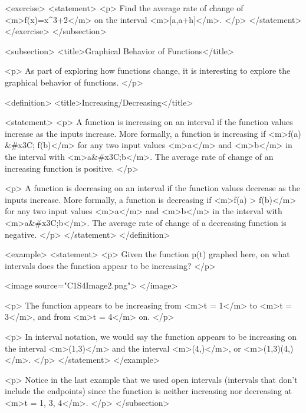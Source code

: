         <exercise>
            <statement>
                <p>
                    Find the average rate of change of <m>f(x)=x^{3}+2</m> on the interval <m>[a,a+h]</m>.
                </p>
            </statement>
        </exercise>
    </subsection>


    <subsection>
        <title>Graphical Behavior of Functions</title>

        <p>
            As part of exploring how functions change, it is interesting to explore the graphical behavior of functions.
        </p>

        <definition>
            <title>Increasing/Decreasing</title>

            <statement>
                <p>
                    A function is increasing on an interval if the function values increase as the inputs increase.
                    More formally, a function is increasing if <m>f(a) &#x3C; f(b)</m> for any two input values <m>a</m> and <m>b</m> in the interval with <m>a&#x3C;b</m>.
                    The average rate of change of an increasing function is positive.
                </p>

                <p>
                    A function is decreasing on an interval if the function values decrease as the inputs increase.
                    More formally, a function is decreasing if <m>f(a) > f(b)</m> for any two input values <m>a</m> and <m>b</m> in the interval with <m>a&#x3C;b</m>.
                    The average rate of change of a decreasing function is negative.
                </p>
            </statement>
        </definition>

        <example>
            <statement>
                <p>
                    Given the function p(t) graphed here, on what intervals does the function appear to be increasing?
                </p>

                <image source="C1S4Image2.png">
                </image>

                <p>
                    The function appears to be increasing from <m>t = 1</m> to <m>t = 3</m>, and from <m>t = 4</m> on.
                </p>

                <p>
                    In interval notation, we would say the function appears to be increasing on the interval <m>(1,3)</m> and the interval <m>(4,\infty)</m>, or <m>(1,3)\cup(4,\infty)</m>.
                </p>
            </statement>
        </example>

        <p>
            Notice in the last example that we used open intervals (intervals that don’t include the endpoints) since the function is neither increasing nor decreasing at <m>t = 1, 3, 4</m>.
        </p>
    </subsection>


